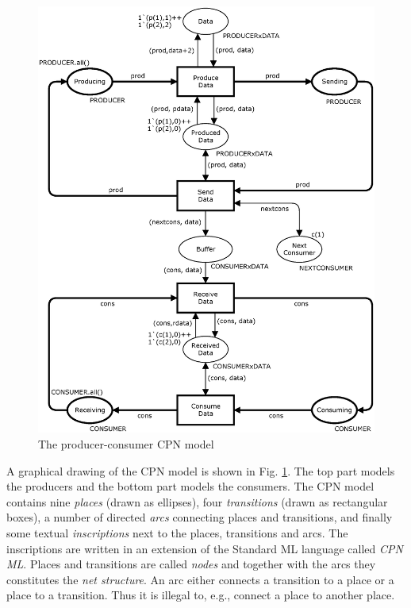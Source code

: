 \begin{figure}[b!]
\centering
\includegraphics[scale=0.5]{background/graphics/System.eps}
\caption{The producer-consumer CPN model}
\label{fig:systemmodule}
\end{figure}

A graphical drawing of the CPN model is shown in Fig. \ref{fig:systemmodule}. The top part models the producers and the bottom part models the consumers. The CPN model contains nine \emph{places} (drawn as ellipses), four \emph{transitions} (drawn as rectangular boxes), a number of directed \emph{arcs} connecting places and transitions, and finally some textual \emph{inscriptions} next to the places, transitions and arcs. The inscriptions are written in an extension of the Standard ML language called \emph{CPN ML}. Places and transitions are called \emph{nodes} and together with the arcs they constitutes the \emph{net structure}. An arc either connects a transition to a place or a place to a transition. Thus it is illegal to, e.g., connect a place to another place.  

